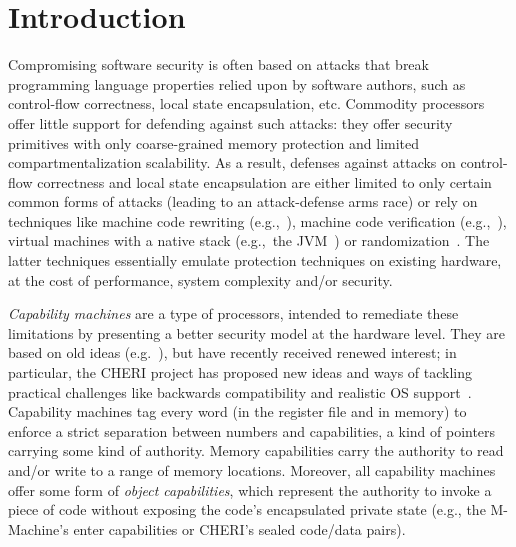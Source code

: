 \documentclass[compsoc,conference,letterpaper,fleqn]{IEEEtran}
\begin{document}
\section{Introduction}
\label{sec:introduction}

Compromising software security is often based on attacks that break programming
language properties relied upon by software authors, such as control-flow
correctness, local state encapsulation, etc. Commodity processors offer little
support for defending against such attacks: they offer security primitives with
only coarse-grained memory protection and limited compartmentalization
scalability. As a result, defenses against attacks on control-flow correctness
and local state encapsulation are either limited to only certain common forms of
attacks (leading to an attack-defense arms race) or rely on techniques like
machine code rewriting
(e.g.,~\cite{wahbe_efficient_1993,abadi_control-flow_2005}), machine code
verification (e.g.,~\cite{morrisett_system_1999}), virtual machines with a
native stack (e.g.,~the JVM~\citep{lindholm_java_2014}) or
randomization~\citep{forrest_building_1997}. The latter techniques essentially
emulate protection techniques on existing hardware, at the cost of performance,
system complexity and/or security.

\emph{Capability machines} are a type of processors, intended to
remediate these limitations by presenting a better security model at
the hardware level. They are based on old ideas
(e.g.~\cite{Carter:1994:HSF:195473.195579,Dennis:1966:PSM:365230.365252,shapiro_eros:_1999}),
but have recently received renewed interest; in particular, the CHERI
project has proposed new ideas and ways of tackling practical
challenges like backwards compatibility and realistic OS
support~\citep{Watson2015Cheri,Woodruff:2014:CCM:2665671.2665740}. Capability
machines tag every word (in the register file and in memory) to
enforce a strict separation between numbers and capabilities, a kind
of pointers carrying some kind of authority. Memory capabilities carry
the authority to read and/or write to a range of memory
locations. Moreover, all capability machines
offer some form of \emph{object capabilities}, which represent the
authority to invoke a piece of code without exposing the code's
encapsulated private state (e.g., the M-Machine's enter capabilities or
CHERI's sealed code/data pairs).
\end{document}
